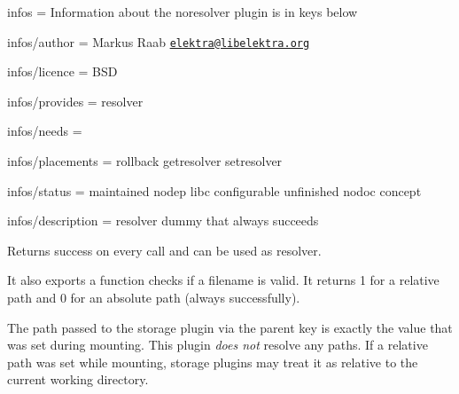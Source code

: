 
\begin{DoxyItemize}
\item infos = Information about the noresolver plugin is in keys below
\item infos/author = Markus Raab \href{mailto:elektra@libelektra.org}{\tt elektra@libelektra.\+org}
\item infos/licence = B\+SD
\item infos/provides = resolver
\item infos/needs =
\item infos/placements = rollback getresolver setresolver
\item infos/status = maintained nodep libc configurable unfinished nodoc concept
\item infos/description = resolver dummy that always succeeds
\end{DoxyItemize}

Returns success on every call and can be used as resolver.

It also exports a function checks if a filename is valid. It returns 1 for a relative path and 0 for an absolute path (always successfully).

The path passed to the storage plugin via the parent key is exactly the value that was set during mounting. This plugin {\itshape does not} resolve any paths. If a relative path was set while mounting, storage plugins may treat it as relative to the current working directory. 